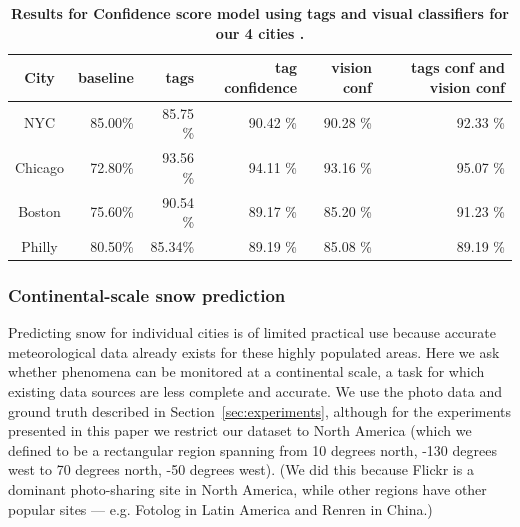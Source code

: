\begin{table}\centering
{}
\caption {\textbf{Results for Confidence score model using tags and visual classifiers for our 4 cities .}}
\label{tab:city_conf_tag_vision} 
\begin{tabular}{@{}crrrrr@{}}\toprule
City &  baseline & tags  &  tag confidence  &  vision conf & tags conf and vision conf \\\midrule
{NYC} & 85.00\% & 85.75 \% &90.42 \%&90.28 \% &92.33 \%\\
{Chicago} &72.80\% & 93.56 \% &94.11 \% &93.16 \% &95.07 \%  \\
{Boston} & 75.60\%& 90.54 \% &89.17 \%&85.20 \% & 91.23 \% \\
{Philly} & 80.50\% & 85.34\% & 89.19 \% &85.08 \%	 & 89.19 \%  \\
\bottomrule
\end{tabular}
\vspace{-12pt}
\end{table}

\subsubsection{{Continental-scale snow prediction}}
Predicting snow for individual cities is of limited practical 
use because accurate meteorological data already exists for these highly populated areas.
Here we ask whether phenomena can be
monitored at a continental scale, a task for which existing data
sources are less complete and accurate.  We use the photo data and
ground truth described in Section~\ref{sec:experiments}, although for the
experiments presented in this paper we restrict our dataset to North
America (which we defined to be a rectangular region spanning from 10
degrees north, -130 degrees west to 70 degrees north, -50 degrees
west). (We did this because Flickr is a dominant photo-sharing site in
North America, while other regions have other popular
sites --- e.g. Fotolog in Latin America and Renren in China.)  

